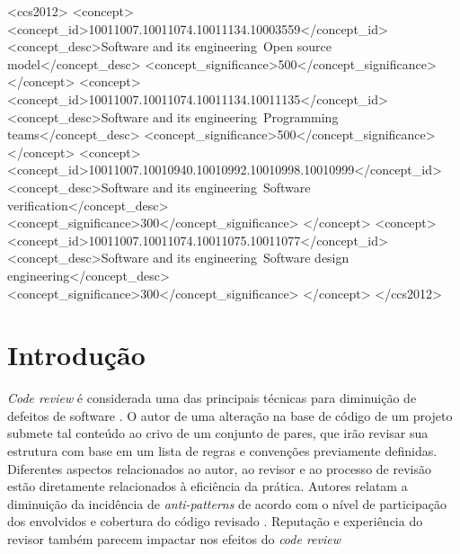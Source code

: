 \documentclass[peerreview]{acmart}
\begin{document}
\begin{CCSXML}
<ccs2012>
<concept>
<concept_id>10011007.10011074.10011134.10003559</concept_id>
<concept_desc>Software and its engineering~Open source model</concept_desc>
<concept_significance>500</concept_significance>
</concept>
<concept>
<concept_id>10011007.10011074.10011134.10011135</concept_id>
<concept_desc>Software and its engineering~Programming teams</concept_desc>
<concept_significance>500</concept_significance>
</concept>
<concept>
<concept_id>10011007.10010940.10010992.10010998.10010999</concept_id>
<concept_desc>Software and its engineering~Software verification</concept_desc>
<concept_significance>300</concept_significance>
</concept>
<concept>
<concept_id>10011007.10011074.10011075.10011077</concept_id>
<concept_desc>Software and its engineering~Software design engineering</concept_desc>
<concept_significance>300</concept_significance>
</concept>
</ccs2012>
\end{CCSXML}




\maketitle

\section{Introdução}

\textit{Code review} é considerada uma das principais técnicas para diminuição de defeitos de software \cite{Boehm2001}. O autor de uma alteração na base de código de um projeto submete tal conteúdo ao crivo de um conjunto de pares, que irão revisar sua estrutura com base em um lista de regras e convenções previamente definidas. Diferentes aspectos relacionados ao autor, ao revisor e ao processo de revisão estão diretamente relacionados à eficiência da prática. Autores relatam a diminuição da incidência de \textit{anti-patterns} \cite{Kemerer2009} de acordo com o nível de participação dos envolvidos e cobertura do código revisado \cite{Meneely201437, Morales2015171, Bavota201581}. Reputação \cite{Bosu2014} e experiência \cite{Kononenko2015111} do revisor também parecem impactar nos efeitos do \textit{code review}
\end{document}
